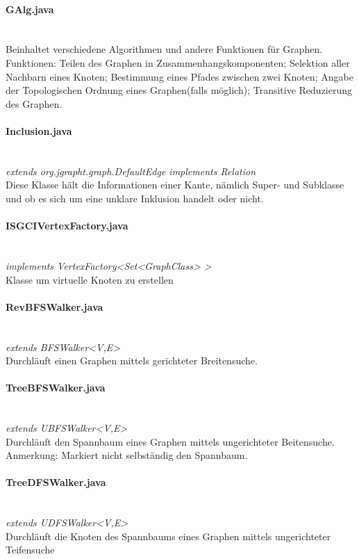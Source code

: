 \documentclass[10pt,a4paper]{article}
\begin{document}
\paragraph{GAlg.java}\ \\
Beinhaltet verschiedene Algorithmen und andere Funktionen für Graphen.\\
Funktionen: Teilen des Graphen in Zusammenhangskomponenten; Selektion aller Nachbarn eines Knoten; Bestimmung eines Pfades zwischen zwei Knoten; Angabe der Topologischen Ordnung eines Graphen(falls möglich); Transitive Reduzierung des Graphen.\\

\paragraph{Inclusion.java}\ \\
\emph{extends org.jgrapht.graph.DefaultEdge
        implements Relation}\\
Diese Klasse hält die Informationen einer Kante, nämlich Super- und Subklasse und ob es sich um eine unklare Inklusion handelt oder nicht.\\
\paragraph{ISGCIVertexFactory.java}\ \\
\emph{ implements VertexFactory<Set<GraphClass> >}\\
Klasse um virtuelle Knoten zu erstellen\\
\paragraph{RevBFSWalker.java}\ \\
\emph{extends BFSWalker<V,E>}\\
Durchläuft einen Graphen mittels gerichteter Breitensuche.\
\paragraph{TreeBFSWalker.java}\ \\
\emph{ extends UBFSWalker<V,E>}\\
Durchläuft den Spannbaum eines Graphen mittels ungerichteter Beitensuche. Anmerkung: Markiert nicht selbständig den Spannbaum.\\
\paragraph{TreeDFSWalker.java}\ \\
\emph{extends UDFSWalker<V,E>}\\
Durchläuft die Knoten des Spannbaums eines Graphen mittels ungerichteter Teifensuche\\
\end{document}
